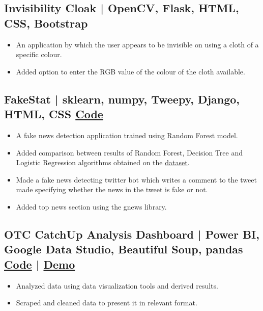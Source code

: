 \documentclass[10pt]{article}
\newenvironment{zitemize}{
\begin{itemize}\itemsep2pt \parskip0pt \parsep1pt}
{\end{itemize}\vspace{-0.5cm}}
\begin{document}


\subsection*{Invisibility Cloak | OpenCV, Flask, HTML, CSS, Bootstrap} 
    \begin{zitemize}
        \item An application by which the user appears to be invisible on using a cloth of a specific colour.
        \item Added option to enter the RGB value of the colour of the cloth available.
    \end{zitemize}


\subsection*{FakeStat | sklearn, numpy, Tweepy, Django, HTML, CSS \hfill \href{https://github.com/mihikagaonkar/FakeStat}{Code}} 
    \begin{zitemize}
        \item A fake news detection application trained using Random Forest model.
        \item Added comparison between results of Random Forest, Decision Tree and Logistic Regression algorithms obtained on the \href{https://www.kaggle.com/shubh0799/fake-news}{dataset}.
        \item Made a fake news detecting twitter bot which writes a comment to the tweet made specifying whether the news in the tweet is fake or not.
        \item Added top news section using the gnews library.
    \end{zitemize}
\subsection*{OTC CatchUp Analysis Dashboard | Power BI, Google Data Studio, Beautiful Soup, pandas \hfill \href{https://github.com/mihikagaonkar/OTC-Dashboard/}{Code}
| \href{https://mihikagaonkar.github.io/OTC-Dashboard/data_studio}{Demo}}
    \begin{zitemize}
        \item Analyzed data using data visualization tools and derived results.
        \item Scraped and cleaned data to present it in relevant format.
    \end{zitemize}
\end{document}
